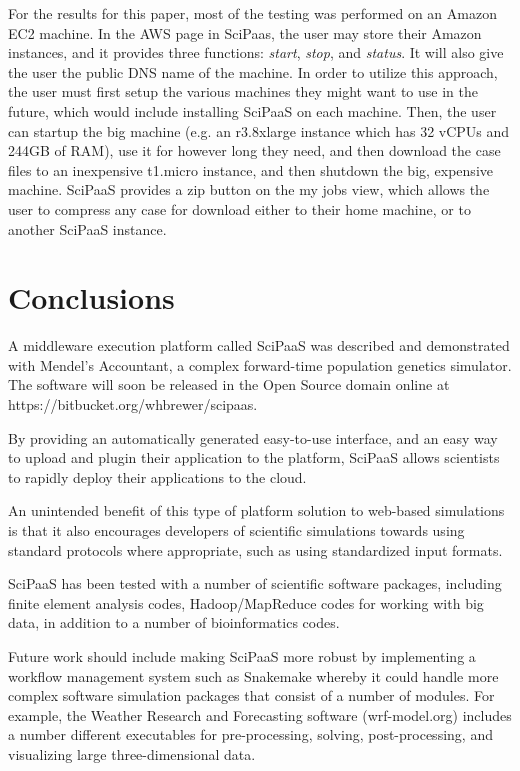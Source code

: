 \documentclass[10pt,reprint]{socc14}
\begin{document}
For the results for this paper, most of the testing was performed on an Amazon EC2 machine. In the AWS page in SciPaas, the user may store their Amazon instances, and it provides three functions: \textit{start}, \textit{stop}, and \textit{status}. It will also give the user the public DNS name of the machine.  In order to utilize this approach, the user must first setup the various machines they might want to use in the future, which would include installing SciPaaS on each machine.  Then, the user can startup the big machine (e.g. an r3.8xlarge instance which has 32 vCPUs and 244GB of RAM), use it for however long they need, and then download the case files to an inexpensive t1.micro instance, and then shutdown the big, expensive machine. SciPaaS provides a zip button on the my jobs view, which allows the user to compress any case for download either to their home machine, or to another SciPaaS instance.  

\section{Conclusions}

A middleware execution platform called SciPaaS was described and demonstrated with Mendel’s Accountant, a complex forward-time population genetics simulator.   The software will soon be released in the Open Source domain online at https://bitbucket.org/whbrewer/scipaas.

By providing an automatically generated easy-to-use interface, and an easy way to upload and plugin their application to the platform, SciPaaS allows scientists to rapidly deploy their applications to the cloud.

An unintended benefit of this type of platform solution to web-based simulations is that it also encourages developers of scientific simulations towards using standard protocols where appropriate, such as using standardized input formats.

SciPaaS has been tested with a number of scientific software packages, including finite element analysis codes, Hadoop/MapReduce codes for working with big data, in addition to a number of bioinformatics codes.  

Future work should include making SciPaaS more robust by implementing a workflow management system such as Snakemake whereby it could handle more complex software simulation packages that consist of a number of modules.  For example, the Weather Research and Forecasting software (wrf-model.org) includes a number different executables for pre-processing, solving, post-processing, and visualizing large three-dimensional data.  
\end{document}
